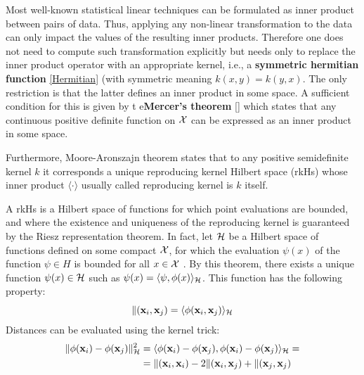 \documentclass[12pt, letterpaper]{article}
\theoremstyle{definition}
\newcommand{\x}{\mathbf{x}}
\let\tb\textbf
\begin{document}
Most  well-known statistical linear techniques can be formulated as inner product between pairs of data. Thus, applying any non-linear transformation to the data can only impact the values of the resulting inner products. Therefore one does not need to compute such transformation explicitly but needs only to replace the inner product operator with an appropriate kernel, i.e., a \tb{symmetric hermitian function} \ref{Hermitian} (with symmetric meaning $k(x,y) = k(y,x)$. The only restriction is that the latter defines an inner product in some space. A sufficient condition for this is given by t e\tb{Mercer's theorem} \ref{} which states that any continuous positive definite function on $\CMcal{X}$ can be expressed as an inner product in some space.

Furthermore, Moore-Aronszajn  theorem states that to any positive semidefinite kernel $k$ it corresponds  a unique reproducing kernel Hilbert space (rkHs)  whose inner product $\langle\cdot \rangle$ usually called reproducing kernel is $k$ itself.

A rkHs is a Hilbert space of functions for which point evaluations are bounded, and where the existence and uniqueness of the reproducing kernel is guaranteed by the Riesz representation theorem. In fact, let $\CMcal{H}$ be a Hilbert space of functions defined on some compact $\CMcal{X}$, for which the evaluation $\psi(x)$ of the function $\psi \in H$ is bounded for all $x \in \CMcal{X}$ . By this theorem, there exists a unique function $\psi(x) \in \CMcal{H}$ such as $\psi(x) = \langle\psi,\phi(x)\rangle_\CMcal{H}$. This function has the following property:
\begin{equation}
\label{EqProd}
\CMcal{k}(\x_i, \x_j) = \langle \phi(\x_i, \x_j) \rangle_\CMcal{H}
\end{equation}
Distances can be evaluated using the kernel trick:
\begin{equation}
\begin{aligned}
\| \phi(\x_i) - \phi(\x_j) \|^2_\CMcal{H} &= \langle \phi(\x_i)- \phi(\x_j),  \phi(\x_i)- \phi(\x_j)\rangle_\CMcal{H}  =\\
&=\CMcal{k}(\x_i, \x_i)- 2 \CMcal{k}(\x_i, \x_j)+\CMcal{k}(\x_j, \x_j)
\end{aligned}
\end{equation}
\end{document}
